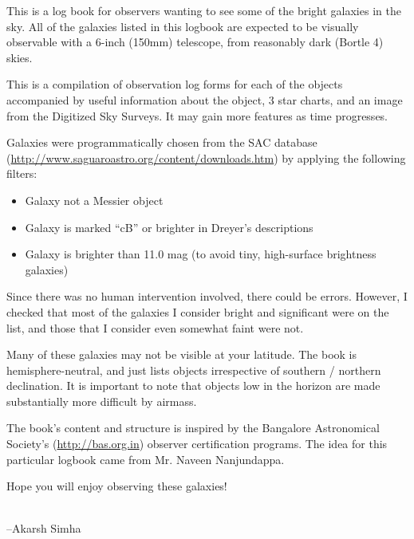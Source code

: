 This is a log book for observers wanting to see some of the bright
galaxies in the sky. All of the galaxies listed in this logbook are
expected to be visually observable with a 6-inch (150mm) telescope,
from reasonably dark (Bortle 4) skies.

This is a compilation of observation log forms for each of the objects
accompanied by useful information about the object, 3 star charts, and
an image from the Digitized Sky Surveys. It may gain more features as
time progresses.

Galaxies were programmatically chosen from the SAC database
(\url{http://www.saguaroastro.org/content/downloads.htm}) by applying
the following filters:
\begin{itemize}
\item Galaxy not a Messier object
\item Galaxy is marked ``cB'' or brighter in Dreyer's descriptions
\item Galaxy is brighter than 11.0 mag (to avoid tiny, high-surface
  brightness galaxies)
\end{itemize}
Since there was no human intervention involved, there could be
errors. However, I checked that most of the galaxies I consider bright
and significant were on the list, and those that I consider even
somewhat faint were not.

Many of these galaxies may not be visible at your latitude. The book
is hemisphere-neutral, and just lists objects irrespective of southern
/ northern declination. It is important to note that objects low in
the horizon are made substantially more difficult by airmass.

The book's content and structure is inspired by the Bangalore
Astronomical Society's (\url{http://bas.org.in}) observer
certification programs. The idea for this particular logbook came from
Mr. Naveen Nanjundappa.

Hope you will enjoy observing these galaxies!

\\

\hfill --Akarsh Simha
